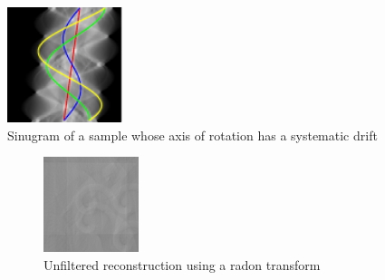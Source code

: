 \begin{figure}
  \centering
  \includegraphics[width=0.3\textwidth]{Chapters/flopt/Figs/PDF/results/helix/sinugram_stretch}
\caption{Sinugram of a sample whose axis of rotation has a systematic drift}
\label{fig:flopt_helix_sinugram}
\end{figure}


\begin{figure}
  \centering
  \hfill
  \begin{subfigure}[t]{0.3\textwidth}
    \includegraphics[width=\textwidth]{Chapters/flopt/Figs/PDF/results/helix/unfilttered_reconstruction_helix_iradon}
    \caption{Unfiltered reconstruction using a radon transform}
    \label{fig:unfilttered_reconstruction_helix_iradon}
  \end{subfigure}\hfill
  \begin{subfigure}[t]{0.3\textwidth}

\end{subfigure}
\end{figure}
